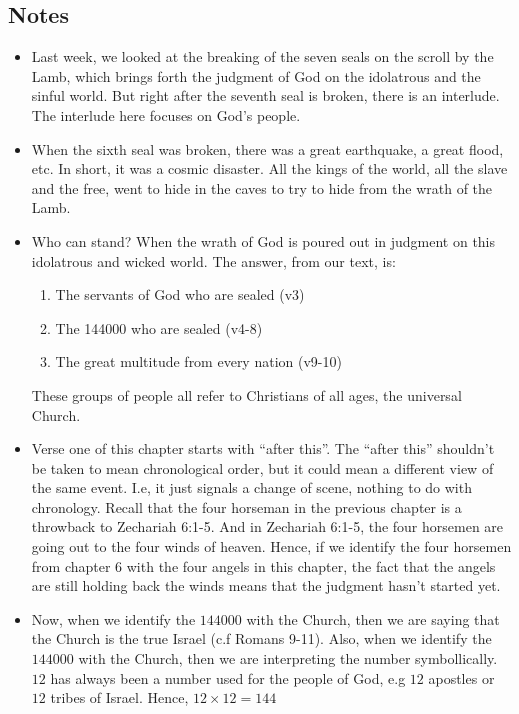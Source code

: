 \subsection*{Notes}
\begin{itemize}
  \item{Last week, we looked at the breaking of the seven seals on the scroll
  by the Lamb, which brings forth the judgment of God on the idolatrous and
  the sinful world.  But right after the seventh seal is broken, there is an
  interlude. The interlude here focuses on God's people. }
  \item{When the sixth seal was broken, there was a great earthquake, a great
  flood, etc.  In short, it was a cosmic disaster.  All the kings of the
  world, all the slave and the free, went to hide in the caves to try to hide
  from the wrath of the Lamb.}
  \item{Who can stand?  When the wrath of God is poured out in judgment on
  this idolatrous and wicked world.  The answer, from our text, is:
  \begin{enumerate}
    \item{The servants of God who are sealed (v3)}
    \item{The 144000 who are sealed (v4-8)}
    \item {The great multitude from every nation (v9-10)}
  \end{enumerate}
  These groups of people all refer to Christians of all ages, the universal
  Church.}
\item{Verse one of this chapter starts with ``after this''.  The ``after
this'' shouldn't be taken to mean chronological order, but it could mean a
different view of the same event.  I.e, it just signals a change of scene,
nothing to do with chronology.  Recall that the four horseman in the previous
chapter is a throwback to Zechariah 6:1-5.  And in Zechariah 6:1-5, the four
horsemen are going out to the four winds of heaven.  Hence, if we identify
the four horsemen from chapter 6 with the four angels in this chapter, the
fact that the angels are still holding back the winds means that the judgment
hasn't started yet.}
\item{Now, when we identify the $144000$ with the Church, then we are saying
that the Church is the true Israel (c.f Romans 9-11).  Also, when we identify
the $144000$ with the Church, then we are interpreting the number
symbollically.  $12$ has always been a number used for the people of God, e.g
$12$ apostles or $12$ tribes of Israel.  Hence, $12 \times 12 = 144$
}
\end{itemize}
